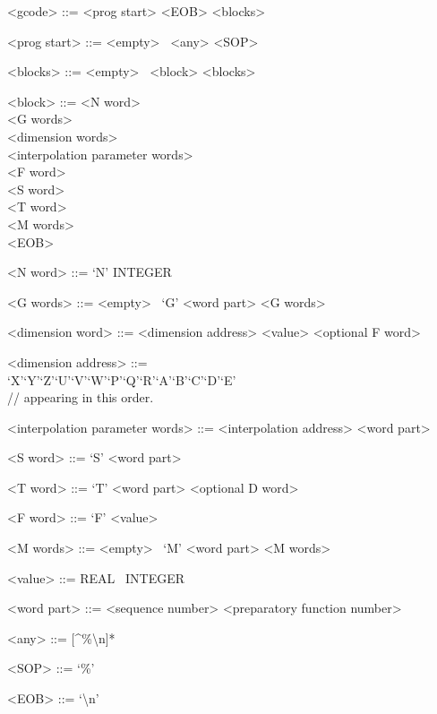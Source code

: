 \begin{grammar}
    <gcode>      ::= <prog start> <EOB> <blocks>

    <prog start> ::= <empty> \textbar\ <any> <SOP>

    <blocks>     ::= <empty> \textbar\ <block> <blocks>

    <block> ::= <N word>\\
                     <G words>\\
                     <dimension words>\\
                     <interpolation parameter words>\\
                     <F word>\\
                     <S word>\\
                     <T word>\\
                     <M words>\\
                     <EOB>

    <N word>     ::= `N' INTEGER

    <G words>    ::= <empty> \textbar\ `G' <word part> <G words>

    <dimension word> ::= <dimension address> <value> <optional F word>

    <dimension address> ::= ~\\`X'\textbar `Y'\textbar `Z'\textbar `U'\textbar `V'\textbar `W'\textbar `P'\textbar `Q'\textbar `R'\textbar `A'\textbar `B'\textbar `C'\textbar `D'\textbar `E' \\// appearing in this order.

    <interpolation parameter words> ::= <interpolation address> <word part>

    <S word> ::= `S' <word part>

    <T word> ::= `T' <word part> <optional D word>

    <F word>     ::= `F' <value>

    <M words>    ::= <empty> \textbar\ `M' <word part> <M words>


    <value>      ::= REAL \textbar\ INTEGER

    <word part>  ::= <sequence number> <preparatory function number>


    <any>    ::= [\^{}\%\textbackslash n]*

    <SOP>    ::= `\%'

    <EOB>    ::= `\textbackslash n'
\end{grammar}

